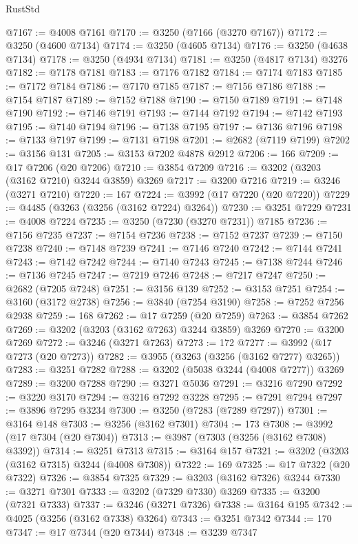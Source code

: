 \begin{lexlean}{RustStd}
\begin{coremodule}
@7167 := @4008 @7161
@7170 := @3250 (@7166 (@3270 @7167))
@7172 := @3250 (@4600 @7134)
@7174 := @3250 (@4605 @7134)
@7176 := @3250 (@4638 @7134)
@7178 := @3250 (@4934 @7134)
@7181 := @3250 (@4817 @7134) @3276
@7182 := @7178 @7181
@7183 := @7176 @7182
@7184 := @7174 @7183
@7185 := @7172 @7184
@7186 := @7170 @7185
@7187 := @7156 @7186
@7188 := @7154 @7187
@7189 := @7152 @7188
@7190 := @7150 @7189
@7191 := @7148 @7190
@7192 := @7146 @7191
@7193 := @7144 @7192
@7194 := @7142 @7193
@7195 := @7140 @7194
@7196 := @7138 @7195
@7197 := @7136 @7196
@7198 := @7133 @7197
@7199 := @7131 @7198
@7201 := @2682 (@7119 @7199)
@7202 := @3156 @131
@7205 := @3153 @7202 @4878 @2912
@7206 := 166
@7209 := @17 @7206 (@20 @7206)
@7210 := @3854 @7209
@7216 := @3202 (@3203 (@3162 @7210) @3244 @3859) @3269
@7217 := @3200 @7216
@7219 := @3246 (@3271 @7210)
@7220 := 167
@7224 := @3992 (@17 @7220 (@20 @7220))
@7229 := @4485 (@3263 (@3256 (@3162 @7224) @3264))
@7230 := @3251 @7229
@7231 := @4008 @7224
@7235 := @3250 (@7230 (@3270 @7231)) @7185
@7236 := @7156 @7235
@7237 := @7154 @7236
@7238 := @7152 @7237
@7239 := @7150 @7238
@7240 := @7148 @7239
@7241 := @7146 @7240
@7242 := @7144 @7241
@7243 := @7142 @7242
@7244 := @7140 @7243
@7245 := @7138 @7244
@7246 := @7136 @7245
@7247 := @7219 @7246
@7248 := @7217 @7247
@7250 := @2682 (@7205 @7248)
@7251 := @3156 @139
@7252 := @3153 @7251
@7254 := @3160 (@3172 @2738)
@7256 := @3840 (@7254 @3190)
@7258 := @7252 @7256 @2938
@7259 := 168
@7262 := @17 @7259 (@20 @7259)
@7263 := @3854 @7262
@7269 := @3202 (@3203 (@3162 @7263) @3244 @3859) @3269
@7270 := @3200 @7269
@7272 := @3246 (@3271 @7263)
@7273 := 172
@7277 := @3992 (@17 @7273 (@20 @7273))
@7282 := @3955 (@3263 (@3256 (@3162 @7277) @3265))
@7283 := @3251 @7282
@7288 := @3202 (@5038 @3244 (@4008 @7277)) @3269
@7289 := @3200 @7288
@7290 := @3271 @5036
@7291 := @3216 @7290
@7292 := @3220 @3170
@7294 := @3216 @7292 @3228
@7295 := @7291 @7294
@7297 := @3896 @7295 @3234
@7300 := @3250 (@7283 (@7289 @7297))
@7301 := @3164 @148
@7303 := @3256 (@3162 @7301)
@7304 := 173
@7308 := @3992 (@17 @7304 (@20 @7304))
@7313 := @3987 (@7303 (@3256 (@3162 @7308) @3392))
@7314 := @3251 @7313
@7315 := @3164 @157
@7321 := @3202 (@3203 (@3162 @7315) @3244 (@4008 @7308))
@7322 := 169
@7325 := @17 @7322 (@20 @7322)
@7326 := @3854 @7325
@7329 := @3203 (@3162 @7326) @3244
@7330 := @3271 @7301
@7333 := @3202 (@7329 @7330) @3269
@7335 := @3200 (@7321 @7333)
@7337 := @3246 (@3271 @7326)
@7338 := @3164 @195
@7342 := @4025 (@3256 (@3162 @7338) @3264)
@7343 := @3251 @7342
@7344 := 170
@7347 := @17 @7344 (@20 @7344)
@7348 := @3239 @7347

\end{coremodule}
\end{lexlean}
